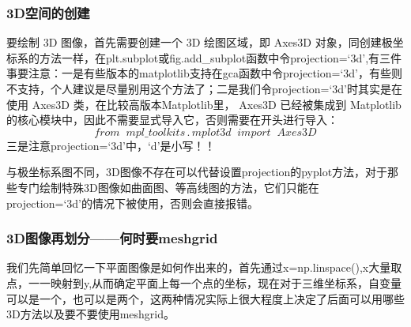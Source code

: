 \documentclass[12pt]{article}
\begin{document}
\subsubsection{3D空间的创建}
要绘制 3D 图像，首先需要创建一个 3D 绘图区域，即   Axes3D   对象，同创建极坐标系的方法一样，在plt.subplot或fig.add\_subplot函数中令projection=‘3d’,有三件事要注意：一是有些版本的matplotlib支持在gca函数中令projection=‘3d’，有些则不支持，个人建议是尽量别用这个方法了；二是我们令projection=‘3d’时其实是在使用   Axes3D   类，在比较高版本Matplotlib里，  Axes3D   已经被集成到 Matplotlib 的核心模块中，因此不需要显式导入它，否则需要在开头进行导入：
\[from\;\; mpl\_toolkits\,.\,mplot3d\;\; import\;\; Axes3D\] 
三是注意projection=‘3d’中，‘d’是小写！！

与极坐标系图不同，3D图像不存在可以代替设置projection的pyplot方法，对于那些专门绘制特殊3D图像如曲面图、等高线图的方法，它们只能在projection=‘3d’的情况下被使用，否则会直接报错。

\subsubsection{3D图像再划分——何时要meshgrid}
我们先简单回忆一下平面图像是如何作出来的，首先通过x=np.linspace(),x大量取点，一一映射到y,从而确定平面上每一个点的坐标，现在对于三维坐标系，自变量可以是一个，也可以是两个，这两种情况实际上很大程度上决定了后面可以用哪些3D方法以及要不要使用meshgrid。
\end{document}
